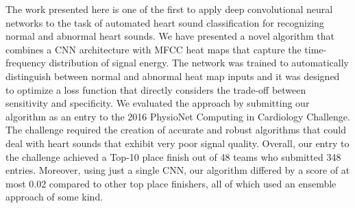 \documentclass{article}
\begin{document}
The work presented here is one of the first to apply deep convolutional neural networks to the task of automated heart sound classification for recognizing normal and abnormal heart sounds.
We have presented a novel algorithm that combines a CNN architecture with MFCC heat maps that capture the time-frequency distribution of signal energy.
The network was trained to automatically distinguish between normal and abnormal heat map inputs and it was designed to optimize a loss function that directly considers the trade-off between sensitivity and specificity.
We evaluated the approach by submitting our algorithm as an entry to the 2016 PhysioNet Computing in Cardiology Challenge.
The challenge required the creation of accurate and robust algorithms that could deal with heart sounds that exhibit very poor signal quality.
Overall, our entry to the challenge achieved a Top-10 place finish out of 48 teams who submitted 348 entries. 
Moreover, using just a single CNN, our algorithm differed by a score of at most 0.02 compared to other top place finishers, all of which used an ensemble approach of some kind.



\end{document}
